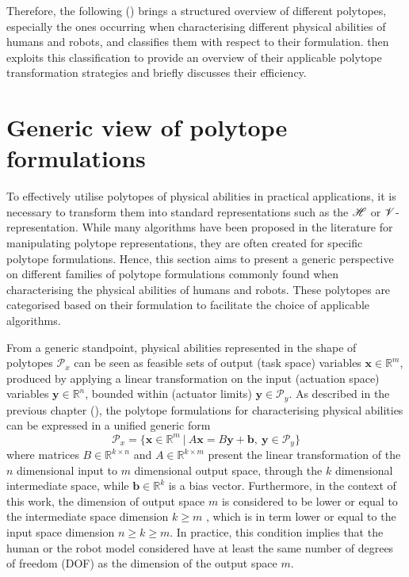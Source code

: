 Therefore, the following () brings a structured overview of different polytopes, especially the ones occurring when characterising different physical abilities of humans and robots, and classifies them with respect to their formulation.  then exploits this classification to provide an overview of their applicable polytope transformation strategies and briefly discusses their efficiency.

\section{Generic view of polytope formulations}
\label{ch:generic_view}

To effectively utilise polytopes of physical abilities in practical applications, it is necessary to transform them into standard representations such as  the $\mathscr{H}$ or $\mathscr{V}$-representation. While many algorithms have been proposed in the literature for manipulating polytope representations, they are often created for specific polytope formulations. Hence, this section aims to present a generic perspective on different families of polytope formulations commonly found when characterising the physical abilities of humans and robots. These polytopes are categorised based on their formulation to facilitate the choice of applicable algorithms.

From a generic standpoint, physical abilities represented in the shape of polytopes $\mathcal{P}_x$ can be seen as feasible sets of output (task space) variables $\bm{x} \in \mathbb{R}^m$, produced by applying a linear transformation on the input (actuation space) variables $\bm{y} \in \mathbb{R}^n$, bounded within (actuator limits) $\bm{y}\in\mathcal{P}_y$. As described in the previous chapter (), the polytope formulations for characterising physical abilities can be expressed in a unified generic form 
\begin{equation}
    \mathcal{P}_x = \{\bm{x}\in\mathbb{R}^m ~|~ A\bm{x}=B\bm{y} + \bm{b}, ~ \bm{y}\in\mathcal{P}_y\}
    \label{eq:generic_polyt_view_revisit}
\end{equation}
where matrices $B\in\mathbb{R}^{k\times n}$ and $A\in\mathbb{R}^{k\times m}$ present the linear transformation of the $n$ dimensional input to $m$ dimensional output space, through the $k$ dimensional intermediate space, while $\bm{b}\in\mathbb{R}^k$ is a bias vector. Furthermore, in the context of this work, the dimension of output space $m$ is considered to be lower or equal to the intermediate space dimension $k\!\geq\! m$ , which is in term lower or equal to the input space dimension $n\!\geq\! k\!\geq\! m$. In practice, this condition implies that the human or the robot model considered have at least the same number of degrees of freedom (DOF) as the dimension of the output space $m$. 

